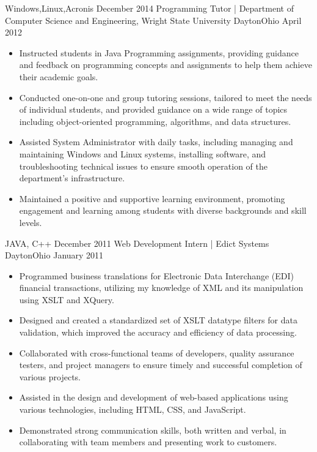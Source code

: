 \begin{experiences}
{\begin{itemize}
      \end{itemize}
  }
  {Windows,Linux,Acronis}
  \emptySeparator
  \experience
    {December 2014}     { Programming Tutor | Department of Computer Science and Engineering, Wright State University }{Dayton}{Ohio}
    {April 2012}    {
      \begin{itemize}
        \item Instructed students in Java Programming assignments, providing guidance and feedback on programming concepts and assignments to help them achieve their academic goals.
        \item Conducted one-on-one and group tutoring sessions, tailored to meet the needs of individual students, and provided guidance on a wide range of topics including object-oriented programming, algorithms, and data structures.
        \item Assisted System Administrator with daily tasks, including managing and maintaining Windows and Linux systems, installing software, and troubleshooting technical issues to ensure smooth operation of the department's infrastructure.
        \item Maintained a positive and supportive learning environment, promoting engagement and learning among students with diverse backgrounds and skill levels.
      \end{itemize}
    }
    {JAVA, C++}
  \emptySeparator
  \experience
  {December 2011}     { Web Development Intern | Edict Systems }{Dayton}{Ohio}
  {January 2011}    {
      \begin{itemize}
          \item Programmed business translations for Electronic Data Interchange (EDI) financial transactions, utilizing my knowledge of XML and its manipulation using XSLT and XQuery.
          \item Designed and created a standardized set of XSLT datatype filters for data validation, which improved the accuracy and efficiency of data processing.
          \item Collaborated with cross-functional teams of developers, quality assurance testers, and project managers to ensure timely and successful completion of various projects.
          \item Assisted in the design and development of web-based applications using various technologies, including HTML, CSS, and JavaScript.
          \item Demonstrated strong communication skills, both written and verbal, in collaborating with team members and presenting work to customers.

\end{itemize}}
\end{experiences}
